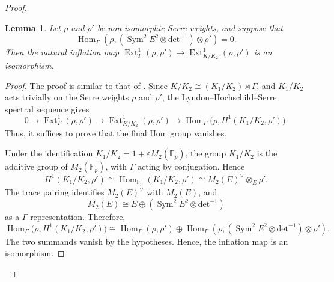 \documentclass[a4paper,10pt,twoside]{amsart}
\DeclareMathOperator{\Ext}{Ext}
\DeclareMathOperator{\Hom}{Hom}
\DeclareMathOperator{\Sym}{Sym}
\newcommand{\Det}{\mathrm{det}}
\newtheorem{lemma}[theorem]{Lemma}
\theoremstyle{definition}
\numberwithin{equation}{section}
\begin{document}
\begin{proof}
\begin{lemma}\label{ext lem}
Let \(\rho\) and \(\rho'\) be non-isomorphic Serre weights, and
suppose that \[
\Hom_\Gamma\!\left(
\rho,
(\Sym^2E^2\otimes\Det^{-1})\otimes\rho'
\right)=0.
\]
Then the natural inflation map
\(
\Ext^1_\Gamma(\rho,\rho')
\rightarrow
\Ext^1_{K/K_2}(\rho,\rho')
\) is an isomorphism.
\end{lemma}


\begin{proof}
The proof is similar to that of \cite[Corollary~5.2]{BP12}. 
Since
\(K/K_2\cong (K_1/K_2)\rtimes\Gamma\), and \(K_1/K_2\) acts trivially on the
Serre weights \(\rho\) and \(\rho'\), the Lyndon--Hochschild--Serre spectral sequence gives
\[
0\longrightarrow
\Ext^1_\Gamma(\rho,\rho')
\longrightarrow
\Ext^1_{K/K_2}(\rho,\rho')
\longrightarrow
\Hom_\Gamma\bigl(\rho,H^1(K_1/K_2,\rho')\bigr).
\]
Thus, it suffices to prove that the final Hom group vanishes.

Under the identification
\(K_1/K_2=1+\varepsilon M_2(\mathbb F_p)\), the group \(K_1/K_2\) is the
additive group of \(M_2(\mathbb F_p)\), with \(\Gamma\) acting by
conjugation. Hence
\[
H^1(K_1/K_2,\rho')
\cong
\Hom_{\mathbb F_p}(K_1/K_2,\rho')
\cong
M_2(E)^\vee\otimes_E\rho'.
\]
The trace pairing identifies \(M_2(E)^\vee\) with \(M_2(E)\), and
\[
M_2(E)\cong E\oplus(\Sym^2E^2\otimes\Det^{-1})
\]
as a \(\Gamma\)-representation. Therefore, 
\[
\Hom_\Gamma\bigl(\rho,H^1(K_1/K_2,\rho')\bigr)
\cong
\Hom_\Gamma(\rho,\rho')
\oplus
\Hom_\Gamma\!\left(
\rho,
(\Sym^2E^2\otimes\Det^{-1})\otimes\rho'
\right).
\]
The two summands vanish by the hypotheses. Hence, the inflation map
is an isomorphism.
\end{proof}



\end{proof}
\end{document}
